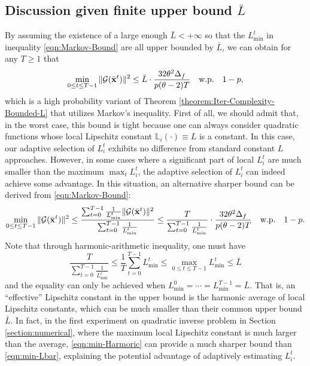 \documentclass{article}
\newcommand{\cG}{\mathcal{G}}
\newcommand{\bL}{\mathbb{L}}
\newcommand{\bx}{\mathbf{x}}
\begin{document}
\subsection{Discussion given finite upper bound $\bar{L}$}
By assuming the existence of a large enough $\bar{L}<+\infty$ so that the $L_{\min}^t$ in 
inequality \eqref{eqn:Markov-Bound} are all upper bounded by $\bar{L}$, we can obtain for any $T\geq1$ that
\begin{equation}
\label{eqn:min-Lbar}
\min_{0\leq t\leq T-1}\|\cG(\bar{\bf x}^{t})\|^2 \leq \bar{L}\cdot \frac{32\theta^2\Delta_f}{p(\theta-2)T}\quad\text{w.p.}\quad 1-p,
\end{equation}
which is a high probability variant of Theorem \ref{theorem:Iter-Complexity-Bounded-L} that utilizes Markov's inequality. First of all, we should admit that, in the worst case, this bound is tight because one can always consider quadratic functions whose local Lipschitz constant $\bL_i(\cdot)\equiv L$ is a constant. In this case, our adaptive selection of $L_i^t$ exhibits no difference from standard constant $L$ approaches. However, in some cases where a significant part of local $L_i^t$ are much smaller than the maximum $\max_t L_i^t$, the adaptive selection of $L_i^t$ can indeed achieve some advantage. In this situation, an alternative sharper bound can be derived from \eqref{eqn:Markov-Bound}:
\begin{equation}
\label{eqn:min-Harmoric}
\min_{0\leq t\leq T-1}\|\cG(\bar{\bf x}^{t})\|^2 \leq \frac{\sum_{t=0}^{T-1} \frac{1}{L_{\min}^t}\|\mathcal{G}(\bar{\bx}^t)\|^2}{\sum_{t=0}^{T-1} \frac{1}{L_{\min}^t}} \leq \frac{T}{\sum_{t=0}^{T-1}\frac{1}{L_{\min}^t}}\cdot  \frac{32\theta^2\Delta_f}{p(\theta-2)T} \quad\text{w.p.}\quad 1-p.
\end{equation}
Note that through harmonic-arithmetic inequality, one must have 
$$\frac{T}{\sum_{t=0}^{T-1}\frac{1}{L_{\min}^t}} \leq \frac{1}{T}\sum_{t=0}^{T-1} L_{\min}^t \leq \max_{0\leq t\leq T-1} L_{\min}^t\leq \bar{L}$$
and the equality can only be achieved when $L_{\min}^0 = \cdots = L_{\min}^{T-1} = \bar{L}$. That is, an ``effective'' Lipschitz constant in the upper bound is the harmonic average of local Lipschitz constants, which can be much smaller than their common upper bound $\bar{L}$. In fact, in the first experiment on quadratic inverse problem in Section \ref{section:numerical}, where the maximum local Lipschitz constant is much larger than the average, \eqref{eqn:min-Harmoric} can provide a much sharper bound than \eqref{eqn:min-Lbar}, explaining the potential advantage of adaptively estimating $L_i^t$. 
\end{document}
